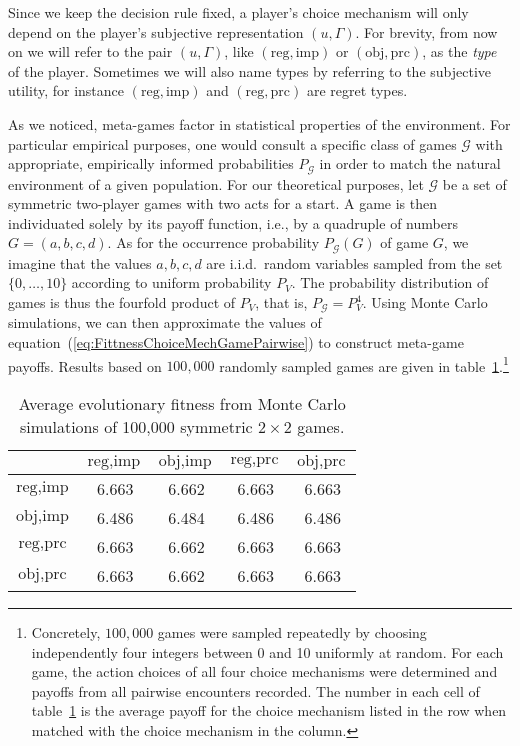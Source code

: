 \documentclass[fleqn,reqno,12pt]{article}
\theoremstyle{Satz}
\theoremstyle{Bsp}
\begin{document}
Since we keep the decision rule fixed, a player's choice mechanism will only depend on the player's subjective representation $ (u,\Gamma) $. For brevity, from now on we will refer to the pair $ (u,\Gamma)$, like $(\text{reg}, \text{imp})$ or $(\text{obj}, \text{prc})$, as the \textit{type} of the player. Sometimes we will also name types by referring to the subjective utility, for instance $(\text{reg}, \text{imp})$ and $(\text{reg}, \text{prc})$ are regret types.

As we noticed, meta-games factor in statistical properties of the environment. For particular empirical
purposes, one would consult a specific class of games $\mathcal{G}$ with appropriate,
empirically informed probabilities $P_{\mathcal{G}}$ in order to match the natural environment of a given
population. 
For our theoretical purposes, let $\mathcal{G}$ be a set of
symmetric two-player games with two acts for a start. A game is then individuated solely by its payoff
function, i.e., by a quadruple of numbers $G=(a,b,c,d)$. As for the occurrence probability $P_{\mathcal{G}}(G)$ of
game $G$, we imagine that the values $a,b,c,d$ are i.i.d.~random variables sampled from the set $ \lbrace 0, \dots, 10 \rbrace$ according to uniform probability $P_{V}$. The probability distribution of games is thus the fourfold product of $P_{V}$, that is, $P_{\mathcal{G}}=P_{V}^{4}$. Using Monte Carlo simulations, we can then
approximate the values of equation~(\ref{eq:FittnessChoiceMechGamePairwise})
to construct meta-game payoffs. Results based on $100,000$ randomly sampled games are given in
table~\ref{tab:ExpectedFitness_4Types}.\footnote{Concretely, $100,000$ games were sampled
  repeatedly by choosing independently four integers between 0 and 10 uniformly at random. For
  each game, the action choices of all four choice mechanisms were determined and payoffs from
  all pairwise encounters recorded. The number
  in each cell of table~\ref{tab:ExpectedFitness_4Types} is the average payoff for the choice
  mechanism listed in the row when matched with the choice mechanism in the column.}

\begin{table}[t]
\centering
\begin{tabular}{ccccc}
  \toprule
 & $\text{reg}, \text{imp}$ 
 & $\text{obj}, \text{imp}$ 
 & $\text{reg}, \text{prc}$ 
 & $\text{obj}, \text{prc}$ \\ 
  \midrule
  $\text{reg}, \text{imp}$ & 6.663 & 6.662 & 6.663 & 6.663 \\ 
  $\text{obj}, \text{imp}$ & 6.486 & 6.484 & 6.486 & 6.486 \\ 
  $\text{reg}, \text{prc}$ & 6.663 & 6.662 & 6.663 & 6.663 \\  
  $\text{obj}, \text{prc}$ & 6.663 & 6.662 & 6.663 & 6.663 \\ 
   \bottomrule
\end{tabular}                    
\caption{Average evolutionary fitness from Monte Carlo simulations of 100,000 symmetric $2 \times 2$ games.}
\label{tab:ExpectedFitness_4Types}
\end{table}
\end{document}
